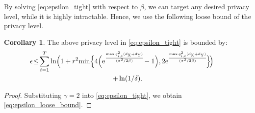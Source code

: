 \documentclass[conference,10pt]{IEEEtran}
\theoremstyle{definition}
\theoremstyle{definition}
\newtheorem{corollary}{Corollary}
\begin{document}
By solving \eqref{eq:epsilon_tight} with respect to $\beta$, we can target any desired privacy level, while it is highly intractable.
Hence, we use the following loose bound of the privacy level.

\begin{corollary}
	The above privacy level in \eqref{eq:epsilon_tight} is bounded by:
	\begin{multline}
		\label{eq:epsilon_loose_bound}
		\hspace{-17pt}\epsilon \!\leq\! \sum_{t = 1}^{T}\ln\Bigl(1 + r^2 \!\min\Bigl\{4\Bigl(\mathrm{e}^{\frac{\max q^2_{i, t}(d_{\mathrm{X}} + d_{\mathrm{Y}})}{(\sigma^2/2\beta)}} \!- 1\Bigr),
		2\mathrm{e}^{\frac{\max q^2_{i, t}(d_{\mathrm{X}} + d_{\mathrm{Y}})}{(\sigma^2/2\beta)}}\!\Bigl\}\!\Bigr)\\
		+ \ln(1/\delta).
	\end{multline}
	\begin{proof}
		Substituting $\gamma=2$ into \eqref{eq:epsilon_tight}, we obtain \eqref{eq:epsilon_loose_bound}.
	\end{proof}
\end{corollary}
\end{document}
